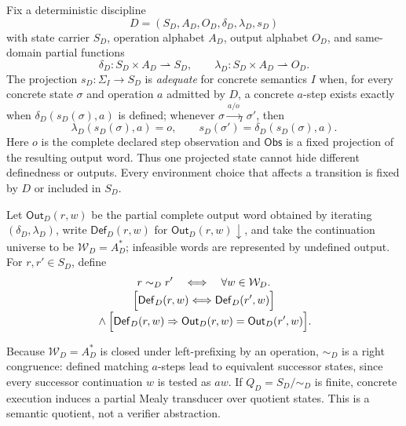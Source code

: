 \documentclass[conference]{IEEEtran}
\begin{document}
Fix a deterministic discipline
\begin{equation}
D=(S_D,A_D,O_D,\delta_D,\lambda_D,s_D)
\end{equation}
with state carrier $S_D$, operation alphabet $A_D$, output alphabet $O_D$, and same-domain partial functions
\begin{equation}
\delta_D:S_D\times A_D\rightharpoonup S_D,
\qquad
\lambda_D:S_D\times A_D\rightharpoonup O_D.
\end{equation}
The projection $s_D:\Sigma_I\to S_D$ is \emph{adequate} for concrete semantics $I$ when, for every concrete state $\sigma$ and operation $a$ admitted by $D$, a concrete $a$-step exists exactly when $\delta_D(s_D(\sigma),a)$ is defined; whenever $\sigma\xrightarrow{a/o}_I\sigma'$, then
\begin{equation}
\lambda_D(s_D(\sigma),a)=o,
\qquad
s_D(\sigma')=\delta_D(s_D(\sigma),a).
\end{equation}
Here $o$ is the complete declared step observation and $\mathsf{Obs}$ is a fixed projection of the resulting output word. Thus one projected state cannot hide different definedness or outputs. Every environment choice that affects a transition is fixed by $D$ or included in $S_D$.

Let $\mathsf{Out}_D(r,w)$ be the partial complete output word obtained by iterating $(\delta_D,\lambda_D)$, write $\mathsf{Def}_D(r,w)$ for $\mathsf{Out}_D(r,w)\downarrow$, and take the continuation universe to be $\mathcal W_D=A_D^*$; infeasible words are represented by undefined output. For $r,r'\in S_D$, define
\begin{equation}
\begin{gathered}
r\sim_D r'
\quad\Longleftrightarrow\quad
\forall w\in\mathcal W_D.\\[-1mm]
\Bigl[\mathsf{Def}_D(r,w)
\Longleftrightarrow
\mathsf{Def}_D(r',w)\Bigr]
\\[-1mm]
{}\land\Bigl[\mathsf{Def}_D(r,w)
\Rightarrow
\mathsf{Out}_D(r,w)=\mathsf{Out}_D(r',w)\Bigr].
\end{gathered}
\end{equation}

Because $\mathcal W_D=A_D^*$ is closed under left-prefixing by an operation, $\sim_D$ is a right congruence: defined matching $a$-steps lead to equivalent successor states, since every successor continuation $w$ is tested as $aw$. If $Q_D=S_D/{\sim_D}$ is finite, concrete execution induces a partial Mealy transducer over quotient states. This is a semantic quotient, not a verifier abstraction.
\end{document}

